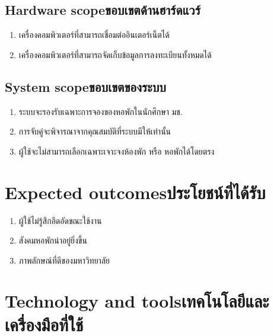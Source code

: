 \subsection{\ifenglish Hardware scope\else ขอบเขตด้านฮาร์ดแวร์\fi}
\begin{enumerate}
    \item เครื่องคอมพิวเตอร์ที่สามารถเชื่อมต่ออินเตอร์เน็ตได้
    \item เครื่องคอมพิวเตอร์ที่สามารถจัดเก็บข้อมูลการลงทะเบียนทั้งหมดได้
\end{enumerate}
\subsection{\ifenglish System scope\else ขอบเขตของระบบ\fi}
\begin{enumerate}
    \item ระบบจะรองรับเฉพาะการจองของหอพักในนักศึกษา มช.
    \item การจับคู่จะพิจารณาจากคุณสมบัติที่ระบบมีให้เท่านั้น
    \item ผู้ใช้จะไม่สามารถเลือกเฉพาะเจาะจงห้องพัก หรือ หอพักได้โดยตรง
\end{enumerate}

\section{\ifenglish Expected outcomes\else ประโยชน์ที่ได้รับ\fi}
\begin{enumerate}
    \item ผู้ใช้ไม่รู้สึกอึดอัดขณะใช้งาน
    \item สังคมหอพักน่าอยู่ยิ่งขึ้น
    \item ภาพลักษณ์ที่ดีของมหาวิทยาลัย
\end{enumerate}

\section{\ifenglish Technology and tools\else เทคโนโลยีและเครื่องมือที่ใช้\fi}


